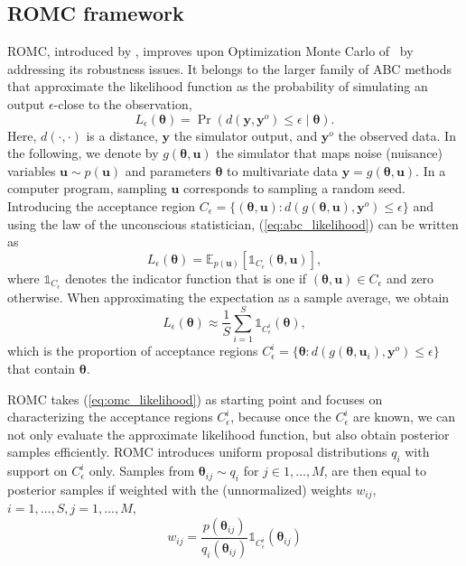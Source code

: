 \documentclass[twoside]{article}
\newcommand{\thb}{\boldsymbol{\theta}}
\newcommand{\ub}{\mathbf{u}}
\newcommand{\yb}{\mathbf{y}}
\newcommand{\data}{\mathbf{y}^o}
\newcommand{\accregioni}{C_{\epsilon}^i}
\newcommand{\E}{\mathbb{E}}
\begin{document}
\subsection{ROMC framework}
\label{subsec:ROMC}
ROMC, introduced by \citet{ikonomov2020robust}, improves upon Optimization Monte Carlo of~\citet{meeds2015optimization} by addressing its robustness issues. 
It belongs to the larger family of ABC methods that approximate the likelihood function as the probability of simulating an output $\epsilon$-close to the observation,
\begin{equation}
L_\epsilon(\thb) = \Pr(d(\yb, \data) \leq \epsilon \mid \thb).
\label{eq:abc_likelihood}
\end{equation}
Here, $d(\cdot, \cdot)$ is a distance, $\yb$ the simulator output, and $\data$ the observed data. In the following, we denote by $g(\thb, \ub)$ the simulator that maps noise (nuisance) variables $\ub \sim p(\ub)$ and parameters $\thb$ to multivariate data $\yb = g(\thb, \ub)$. 
In a computer program, sampling $\ub$ corresponds to sampling a random seed.
Introducing the acceptance region $C_\epsilon = \{(\thb, \ub): d(g(\thb, \ub), \data)\le \epsilon\}$ and using the law of the unconscious statistician, (\ref{eq:abc_likelihood}) can be written as
\begin{equation}
    L_\epsilon(\thb) = \E_{p(\ub)}\left[\mathbb{1}_{C_\epsilon}(\thb, \ub) \right],
\end{equation}
where $\mathbb{1}_{C_\epsilon}$ denotes the indicator function that is one if $(\thb, \ub)\in C_\epsilon$ and zero otherwise. When approximating the expectation as a sample average, we obtain
\begin{equation}
    L_\epsilon(\thb) \approx \frac{1}{S} \sum_{i=1}^S \mathbb{1}_{\accregioni}(\thb),
    \label{eq:omc_likelihood}
\end{equation}
which is the proportion of acceptance regions $\accregioni = \{\thb : d(g(\thb, \ub_i), \data) \leq \epsilon \}$ that contain $\thb$.

ROMC takes (\ref{eq:omc_likelihood}) as starting point and focuses on characterizing the acceptance regions $\accregioni$, because once the $\accregioni$ are known, we can not only evaluate the approximate likelihood function, but also obtain posterior samples efficiently. ROMC introduces uniform proposal distributions $q_i$ with support on $\accregioni$ only. Samples from $\thb_{ij} \sim q_i$ for $j \in 1,\ldots, M$, are then equal to posterior samples if weighted with the (unnormalized) weights $w_{ij}$, $i=1, \ldots, S, j=1, \ldots, M$,
\begin{equation}
w_{ij} = \frac{p(\thb_{ij})}{q_i(\thb_{ij})} \mathbb{1}_{C^i_{\epsilon}}(\thb_{ij}) \label{eq:romc_weight}
\end{equation}
\end{document}
